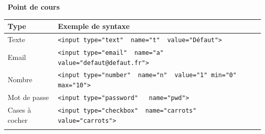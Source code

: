 \documentclass[
  11pt,
]{article}
\newcommand{\passthrough}[1]{#1}
\newcounter{def}
\newcounter{cours}
\newenvironment{cours}[1]
{\par \medskip   \addtocounter{cours}{1} \noindent  
\begin{bclogo}[arrondi =0.1,  ombre = true, barre=none, logo=\bcbook, marge=4]{~\textbf{Point de cours} \textbf{\thecours} {\itshape #1} }  \par}
{
\end{bclogo}
 \par \bigskip }
\begin{document}
\begin{cours}{}
\begin{enumerate}
  \begin{longtable}[]{@{}ll@{}}
  \toprule
  \begin{minipage}[b]{0.47\columnwidth}\raggedright
  Type\strut
  \end{minipage} & \begin{minipage}[b]{0.47\columnwidth}\raggedright
  Exemple de syntaxe\strut
  \end{minipage}\tabularnewline
  \midrule
  \endhead
  \begin{minipage}[t]{0.47\columnwidth}\raggedright
  Texte\strut
  \end{minipage} & \begin{minipage}[t]{0.47\columnwidth}\raggedright
  \passthrough{\lstinline!<input type="text"  name="t"  value="Défaut">!}\strut
  \end{minipage}\tabularnewline
  \begin{minipage}[t]{0.47\columnwidth}\raggedright
  Email\strut
  \end{minipage} & \begin{minipage}[t]{0.47\columnwidth}\raggedright
  \passthrough{\lstinline!<input type="email"  name="a"  value="defaut@defaut.fr">!}\strut
  \end{minipage}\tabularnewline
  \begin{minipage}[t]{0.47\columnwidth}\raggedright
  Nombre\strut
  \end{minipage} & \begin{minipage}[t]{0.47\columnwidth}\raggedright
  \passthrough{\lstinline!<input type="number"  name="n"  value="1" min="0" max="10">!}\strut
  \end{minipage}\tabularnewline
  \begin{minipage}[t]{0.47\columnwidth}\raggedright
  Mot de passe\strut
  \end{minipage} & \begin{minipage}[t]{0.47\columnwidth}\raggedright
  \passthrough{\lstinline!<input type="password"   name="pwd">!}\strut
  \end{minipage}\tabularnewline
  \begin{minipage}[t]{0.47\columnwidth}\raggedright
  Cases à cocher\strut
  \end{minipage} & \begin{minipage}[t]{0.47\columnwidth}\raggedright
  \passthrough{\lstinline!<input type="checkbox"  name="carrots"  value="carrots">!}\strut
  \end{minipage}\tabularnewline
  \begin{minipage}[t]{0.47\columnwidth}\raggedright

\end{minipage}
\end{longtable}
\end{enumerate}
\end{cours}
\end{document}
